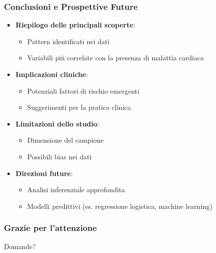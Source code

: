 \documentclass{beamer}
\begin{document}
\begin{frame}
\frametitle{Conclusioni e Prospettive Future}
\begin{itemize}
    \item \textbf{Riepilogo delle principali scoperte}:
    \begin{itemize}
        \item Pattern identificati nei dati
        \item Variabili più correlate con la presenza di malattia cardiaca
    \end{itemize}
    \item \textbf{Implicazioni cliniche}:
    \begin{itemize}
        \item Potenziali fattori di rischio emergenti
        \item Suggerimenti per la pratica clinica
    \end{itemize}
    \item \textbf{Limitazioni dello studio}:
    \begin{itemize}
        \item Dimensione del campione
        \item Possibili bias nei dati
    \end{itemize}
    \item \textbf{Direzioni future}:
    \begin{itemize}
        \item Analisi inferenziale approfondita
        \item Modelli predittivi (es. regressione logistica, machine learning)
    \end{itemize}
\end{itemize}
\end{frame}

\begin{frame}
\frametitle{Grazie per l'attenzione}
\begin{center}
    \large{Domande?}
\end{center}
\end{frame}
\end{document}
